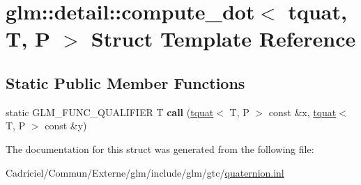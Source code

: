\hypertarget{structglm_1_1detail_1_1compute__dot_3_01tquat_00_01_t_00_01_p_01_4}{}\section{glm\+:\+:detail\+:\+:compute\+\_\+dot$<$ tquat, T, P $>$ Struct Template Reference}
\label{structglm_1_1detail_1_1compute__dot_3_01tquat_00_01_t_00_01_p_01_4}
\subsection*{Static Public Member Functions}
\begin{DoxyCompactItemize}
\item 
static G\+L\+M\+\_\+\+F\+U\+N\+C\+\_\+\+Q\+U\+A\+L\+I\+F\+I\+ER T {\bfseries call} (\hyperlink{structglm_1_1detail_1_1tquat}{tquat}$<$ T, P $>$ const \&x, \hyperlink{structglm_1_1detail_1_1tquat}{tquat}$<$ T, P $>$ const \&y)\hypertarget{structglm_1_1detail_1_1compute__dot_3_01tquat_00_01_t_00_01_p_01_4_a4f27c293f2e5e43f23e019303336601e}{}\label{structglm_1_1detail_1_1compute__dot_3_01tquat_00_01_t_00_01_p_01_4_a4f27c293f2e5e43f23e019303336601e}

\end{DoxyCompactItemize}


The documentation for this struct was generated from the following file\+:\begin{DoxyCompactItemize}
\item 
Cadriciel/\+Commun/\+Externe/glm/include/glm/gtc/\hyperlink{glm_2include_2glm_2gtc_2quaternion_8inl}{quaternion.\+inl}\end{DoxyCompactItemize}
